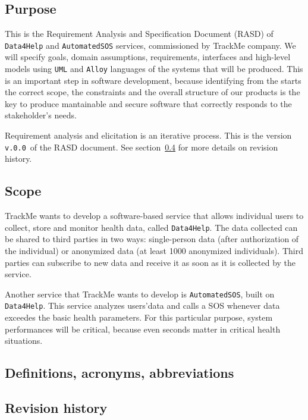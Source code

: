 \documentclass[12pt]{article}
\def \thisDocVersion {\texttt{v.0.0}}
\begin{document}
  \subsection{Purpose}

    This is the Requirement Analysis and Specification Document (RASD) of \texttt{Data4Help} and \texttt{AutomatedSOS} services, commissioned by TrackMe company. We will specify goals, domain assumptions, requirements, interfaces and high-level models using \texttt{UML} and \texttt{Alloy} languages of the systems that will be produced. This is an important step in software development, because identifying from the starts the correct scope, the constraints and the overall structure of our products is the key to produce mantainable and secure software that correctly responds to the stakeholder's needs.

    Requirement analysis and elicitation is an iterative process. This is the version \thisDocVersion\ of the RASD document. See section~\ref{sec:revhistory} for more details on revision history.

  \subsection{Scope}

    TrackMe wants to develop a software-based service that allows individual users to collect, store and monitor health data, called \texttt{Data4Help}. The data collected can be shared to third parties in two ways: single-person data (after authorization of the individual) or anonymized data (at least 1000 anonymized individuals). Third parties can subscribe to new data and receive it as soon as it is collected by the service.

    Another service that TrackMe wants to develop is \texttt{AutomatedSOS}, built on \texttt{Data4Help}. This service analyzes users'data and calls a SOS whenever data exceedes the basic health parameters. For this particular purpose, system performances will be critical, because even seconds matter in critical health situations.


  \subsection{Definitions, acronyms, abbreviations}
  \subsection{Revision history}
  \label{sec:revhistory}
\end{document}
